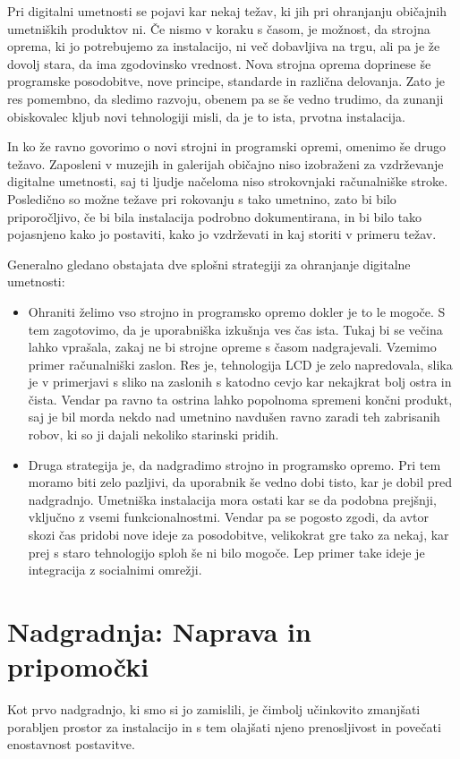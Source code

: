 Pri digitalni umetnosti se pojavi kar nekaj težav, ki jih pri ohranjanju
običajnih umetniških produktov ni. Če nismo v koraku s časom, je možnost, da
strojna oprema, ki jo potrebujemo za instalacijo, ni več dobavljiva na trgu,
ali pa je že dovolj stara, da ima zgodovinsko vrednost. Nova strojna
oprema doprinese še programske posodobitve, nove principe, standarde in različna
delovanja. Zato je res pomembno, da sledimo razvoju, obenem pa
se še vedno trudimo, da zunanji obiskovalec kljub novi tehnologiji misli, da je to ista, prvotna instalacija.

In ko že ravno govorimo o novi strojni in programski opremi, omenimo še drugo težavo. Zaposleni v muzejih in galerijah običajno niso izobraženi za vzdrževanje digitalne umetnosti, saj ti ljudje načeloma niso strokovnjaki računalniške stroke. Posledično so možne težave pri rokovanju s tako umetnino, zato bi bilo priporočljivo, če bi bila instalacija podrobno dokumentirana, in bi bilo tako pojasnjeno kako jo postaviti, kako jo vzdrževati in kaj storiti v primeru težav.

Generalno gledano obstajata dve splošni strategiji za ohranjanje digitalne umetnosti:
\begin{itemize}
\item
Ohraniti želimo vso strojno in programsko opremo dokler je  to le mogoče. S tem
zagotovimo, da je uporabniška izkušnja ves čas ista. Tukaj bi se večina lahko vprašala, zakaj ne bi strojne opreme s časom nadgrajevali. Vzemimo primer računalniški
zaslon. Res je, tehnologija LCD je zelo napredovala, slika je v primerjavi s sliko na zaslonih s katodno cevjo kar nekajkrat bolj ostra in čista. Vendar pa ravno ta
ostrina lahko popolnoma spremeni končni produkt, saj je bil morda nekdo nad umetnino navdušen ravno zaradi teh zabrisanih robov, ki so ji dajali nekoliko starinski pridih.

\item
Druga strategija je, da nadgradimo strojno in programsko opremo. Pri tem moramo biti zelo pazljivi, da uporabnik še vedno dobi tisto, kar je dobil pred nadgradnjo. Umetniška instalacija mora ostati kar se da podobna prejšnji, vključno z vsemi funkcionalnostmi. Vendar pa se pogosto zgodi, da avtor skozi čas pridobi nove ideje za posodobitve, velikokrat gre tako za nekaj, kar prej s staro tehnologijo sploh še ni bilo mogoče. Lep primer take ideje je integracija z socialnimi omrežji.
\end{itemize}


\chapter{Nadgradnja: Naprava in pripomočki}
Kot prvo nadgradnjo, ki smo si jo zamislili, je čimbolj učinkovito zmanjšati
porabljen prostor za instalacijo in s tem olajšati njeno prenosljivost in povečati enostavnost postavitve.

